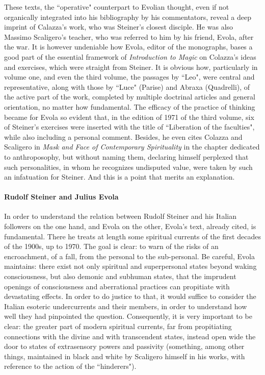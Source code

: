 These texts, the ``operative" counterpart to Evolian thought, even if not organically integrated into his bibliography by his commentators, reveal a deep imprint of Calazza's work, who was Steiner's closest disciple. He was also Massimo Scaligero's teacher, who was referred to him by his friend, Evola, after the war. It is however undeniable how Evola, editor of the monographs, bases a good part of the essential framework of \emph{Introduction to Magic} on Colazza's ideas and exercises, which were straight from Steiner. It is obvious how, particularly in volume one, and even the third volume, the passages by ``Leo", were central and representative, along with those by ``Luce" (Parise) and Abraxa (Quadrelli), of the active part of the work, completed by multiple doctrinal articles and general orientation, no matter how fundamental. The efficacy of the practice of thinking became for Evola so evident that, in the edition of 1971 of the third volume, six of Steiner's exercises were inserted with the title of ``Liberation of the faculties", while also including a personal comment. Besides, he even cites Colazza and Scaligero in \emph{Mask and Face of Contemporary Spirituality} in the chapter dedicated to anthroposophy, but without naming them, declaring himself perplexed that such personalities, in whom he recognizes undisputed value, were taken by such an infatuation for Steiner. And this is a point that merits an explanation.

\paragraph{Rudolf Steiner and Julius Evola}

In order to understand the relation between Rudolf Steiner and his Italian followers on the one hand, and Evola on the other, Evola's text, already cited, is fundamental. There he treats at length some spiritual currents of the first decades of the 1900s, up to 1970. The goal is clear: to warn of the risks of an encroachment, of a fall, from the personal to the sub-personal. Be careful, Evola maintains: there exist not only spiritual and superpersonal states beyond waking consciousness, but also demonic and subhuman states, that the imprudent openings of consciousness and aberrational practices can propitiate with devastating effects. In order to do justice to that, it would suffice to consider the Italian esoteric undercurrents and their members, in order to understand how well they had pinpointed the question. Consequently, it is very important to be clear: the greater part of modern spiritual currents, far from propitiating connections with the divine and with transcendent states, instead open wide the door to states of extrasensory powers and passivity (something, among other things, maintained in black and white by Scaligero himself in his works, with reference to the action of the ``hinderers").

